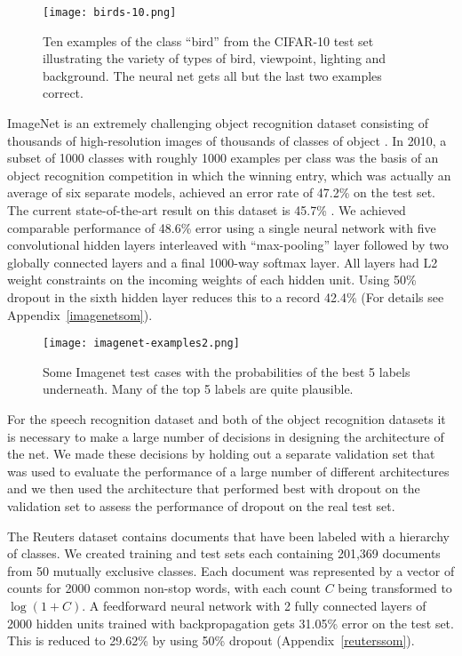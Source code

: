 \documentclass[12pt]{article}
\begin{document}
\begin{figure}[t]
\centerline{\texttt{[image: birds-10.png]}}
\caption{Ten examples of the class ``bird'' from the CIFAR-10 test set illustrating the
  variety of types of bird, viewpoint, lighting and background. The neural net gets all
  but the last two examples correct.}
\label{fig:cifar}
\end{figure}

ImageNet is an extremely challenging object recognition dataset consisting of thousands of
high-resolution images of thousands of classes of object \cite{Imagenet}. In 2010, a
subset of 1000 classes with roughly 1000 examples per class was the basis of an object
recognition competition in which the winning entry, which was actually an average of six
separate models, achieved an error rate of 47.2\% on the test set. The current state-of-the-art 
result on this dataset is 45.7\% \cite{winner45}. We achieved comparable performance of 
48.6\% error using a single neural
network with five convolutional hidden layers interleaved with ``max-pooling''
layer followed by two globally connected layers and a final
1000-way softmax layer. All layers had L2 weight constraints on the incoming weights of
each hidden unit. Using 50\% dropout in the sixth hidden layer reduces this to a record
42.4\% (For details see Appendix~\ref{imagenetsom}).

\begin{figure}[b]
\centerline{\texttt{[image: imagenet-examples2.png]}}
\caption{Some Imagenet test cases with the probabilities of the best 5 labels
  underneath. Many of the top 5 labels are quite plausible.}
\label{fig:imagenet}
\end{figure}


For the speech recognition dataset and both of the object recognition datasets it is
necessary to make a large number of decisions in designing the architecture of the net. We
made these decisions by holding out a separate validation set that was used to evaluate
the performance of a large number of different architectures and we then used the
architecture that performed best with dropout on the validation set to assess the
performance of dropout on the real test set. 

The Reuters dataset contains documents that have been labeled with a hierarchy of 
classes. We created training and test sets each containing 201,369 documents from 50 mutually
exclusive classes. Each document was represented by a vector of counts for 2000 common
non-stop words, with each count $C$ being transformed to $\log(1+C)$. A feedforward neural
network with 2 fully connected layers of 2000 hidden units trained with backpropagation
gets 31.05\% error on the test set. This is reduced to 29.62\% by using 50\% dropout (Appendix~\ref{reuterssom}).
\end{document}
